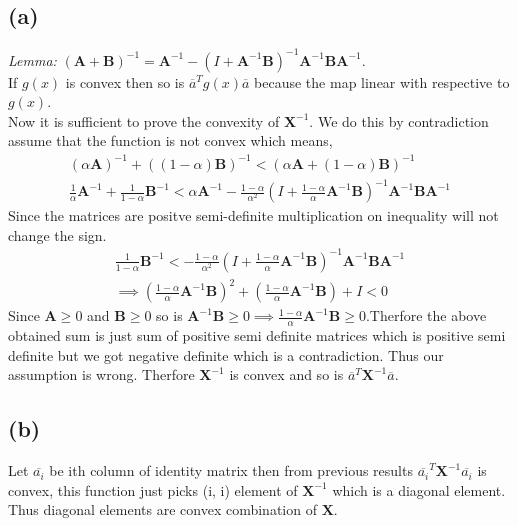 \documentclass{article}
\begin{document}
\subsection*{(a)}
\textit{Lemma:} $(\mathbf{A} + \mathbf{B})^{-1} = \mathbf{A}^{-1} - (I + \mathbf{A}^{-1}\mathbf{B})^{-1}\mathbf{A}^{-1}\mathbf{B}\mathbf{A}^{-1}$.\\
If $g(x)$ is convex then so is $\overline{a}^Tg(x)\overline{a}$ because the map linear with respective to $g(x)$.\\
Now it is sufficient to prove the convexity of $\mathbf{X}^{-1}$. We do this by contradiction assume that the function is not convex which means,
\begin{gather*}
	(\alpha \mathbf{A})^{-1} + ((1-\alpha)\mathbf{B})^{-1} < \left(\alpha \mathbf{A} + (1-\alpha)\mathbf{B}\right)^{-1}\\
	\frac{1}{\alpha} \mathbf{A}^{-1} + \frac{1}{1-\alpha}\mathbf{B}^{-1} < \alpha \mathbf{A}^{-1} - \frac{1-\alpha}{\alpha ^2}(I + \frac{1-\alpha}{\alpha}\mathbf{A}^{-1}\mathbf{B})^{-1}\mathbf{A}^{-1}\mathbf{BA}^{-1}
\end{gather*}
Since the matrices are positve semi-definite multiplication on inequality will not change the sign.
\begin{gather*}
	\frac{1}{1-\alpha}\mathbf{B}^{-1} <  - \frac{1-\alpha}{\alpha ^2}(I + \frac{1-\alpha}{\alpha}\mathbf{A}^{-1}\mathbf{B})^{-1}\mathbf{A}^{-1}\mathbf{BA}^{-1}\\
	\implies \left(\frac{1-\alpha}{\alpha}\mathbf{A}^{-1}\mathbf{B}\right)^2 + \left(\frac{1-\alpha}{\alpha}\mathbf{A}^{-1}\mathbf{B}\right) + I < 0
\end{gather*}
Since $\mathbf{A} \ge 0$ and $\mathbf{B} \ge 0$ so is $\mathbf{A}^{-1}\mathbf{B} \ge 0 \implies \frac{1-\alpha}{\alpha}\mathbf{A}^{-1}\mathbf{B} \ge 0$.Therfore the above obtained sum is just sum of positive semi definite matrices which is positive semi definite but we got negative definite which is a contradiction. Thus our assumption is wrong. Therfore $\mathbf{X}^{-1}$ is convex and so is $\overline{a}^T\mathbf{X}^{-1}\overline{a}$.
\subsection*{(b)}
Let $\overline{a_i}$ be ith column of identity matrix then from previous results $\overline{a_i}^T{\mathbf{X}^{-1}}\overline{a_i}$ is convex, this function just picks (i, i) element of ${\mathbf{X}^{-1}}$ which is a diagonal element. Thus diagonal elements are convex combination of $\mathbf{X}$.
\end{document}
